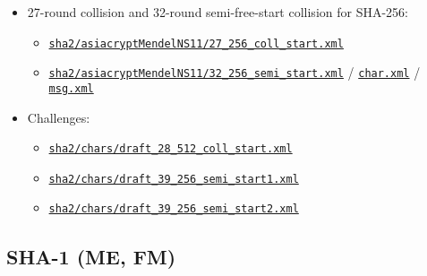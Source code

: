 \documentclass[11pt, a4paper]{article}
\newcommand{\hashlink}[2][black]{\href{https://extgit.iaik.tugraz.at/krypto/nldtool/blob/master/hash/#2}{\color{#1}\nolinkurl{#2}}}
\newcommand{\hashshrt}[3][black]{\href{https://extgit.iaik.tugraz.at/krypto/nldtool/blob/master/hash/#2}{\color{#1}\nolinkurl{#3}}}
\begin{document}
\begin{itemize}
  \item {}

    27-round collision and 32-round semi-free-start collision for SHA-256:
    \begin{itemize}
      \item \hashlink[done]{sha2/asiacryptMendelNS11/27_256_coll_start.xml}
      \item \hashlink[done]{sha2/asiacryptMendelNS11/32_256_semi_start.xml}
          / \hashshrt[done]{sha2/asiacryptMendelNS11/32_256_semi_char.xml}{char.xml}
          / \hashshrt[done]{sha2/asiacryptMendelNS11/32_256_semi_msg.xml}{msg.xml}
    \end{itemize}

  \item Challenges:
    \begin{itemize}
      \item \hashlink[done]{sha2/chars/draft_28_512_coll_start.xml}
      \item \hashlink[done]{sha2/chars/draft_39_256_semi_start1.xml}
      \item \hashlink[done]{sha2/chars/draft_39_256_semi_start2.xml}
    \end{itemize}
\end{itemize}

\subsection{SHA-1 (ME, FM)}
\end{document}
